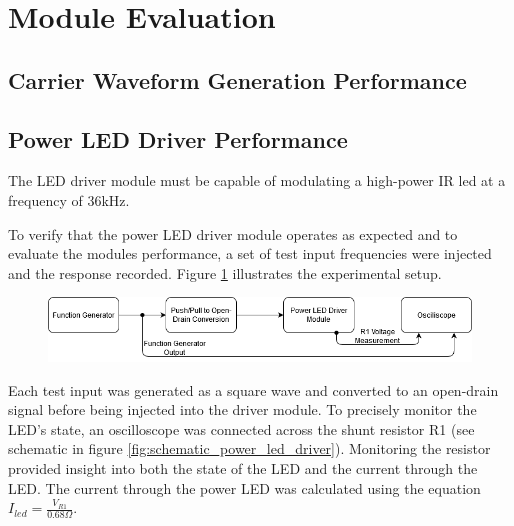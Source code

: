 


\section{Module Evaluation}

\subsection{Carrier Waveform Generation Performance}





\subsection{Power LED Driver Performance}

The LED driver module must be capable of modulating a high-power IR led at a frequency of 36kHz.

To verify that the power LED driver module operates as expected and to evaluate the modules performance, a set of test input frequencies were injected and the response recorded. Figure \ref{fig:power_led_driver_experiemnet_setup} illustrates the experimental setup.

\begin{figure}[H]
	\centering
	\includegraphics[width=.9\linewidth]{figures/experimentation/power_led_driver_experimental_setup.png}
	\label{fig:power_led_driver_experiemnet_setup}
\end{figure}

Each test input was generated as a square wave and converted to an open-drain signal before being injected into the driver module. To precisely monitor the LED's state, an oscilloscope was connected across the shunt resistor R1 (see schematic in figure \ref{fig:schematic_power_led_driver}). Monitoring the resistor provided insight into both the state of the LED and the current through the LED. The current through the power LED was calculated using the equation \(I_{led} = \frac{V_{R1}}{0.68\Omega}\).



